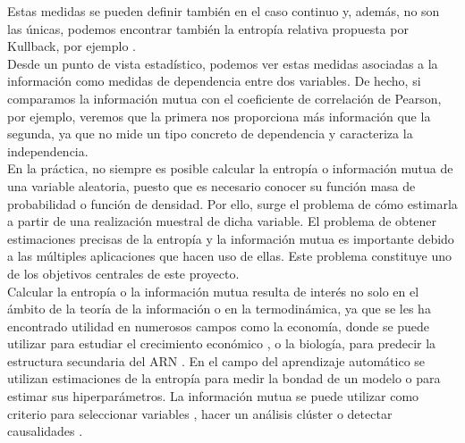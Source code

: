 \documentclass[12pt,a4paper]{report} %
\theoremstyle{definition}
\begin{document}
Estas medidas se pueden definir también en el caso continuo y, además, no son las únicas, podemos encontrar también la entropía relativa propuesta por Kullback, por ejemplo \cite{thomas}.\\

Desde un punto de vista estadístico, podemos ver estas medidas asociadas a la información como medidas de dependencia entre dos variables. De hecho, si comparamos la información mutua con el coeficiente de correlación de Pearson, por ejemplo, veremos que la primera nos proporciona más información que la segunda, ya que no mide un tipo concreto de dependencia y caracteriza la independencia.\\

En la práctica, no siempre es posible calcular la entropía o información mutua de una variable aleatoria, puesto que es necesario conocer su función masa de probabilidad o función de densidad. Por ello, surge el problema de cómo estimarla a partir de una realización muestral de dicha variable. El problema de obtener estimaciones precisas de la entropía y la información mutua es importante debido a las múltiples aplicaciones que hacen uso de ellas. Este problema constituye uno de los objetivos centrales de este proyecto.\\

Calcular la entropía o la información mutua resulta de interés no solo en el ámbito de la teoría de la información o en la termodinámica, ya que se les ha encontrado utilidad en numerosos campos como la economía, donde se puede utilizar para estudiar el crecimiento económico \cite{economy}, o la biología, para predecir la estructura secundaria del ARN \cite{freyhult}. En el campo del aprendizaje automático se utilizan estimaciones de la entropía para medir la bondad de un modelo \cite{anewclass} o para estimar sus hiperparámetros. La información mutua se puede utilizar como criterio para seleccionar variables \cite{feature}, hacer un análisis clúster \cite{cluster} o detectar causalidades \cite{causality}.\\
\end{document}

